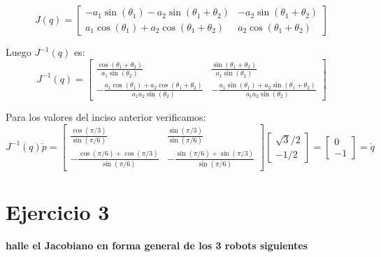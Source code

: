 \documentclass[a4paper,12pt]{article}
\begin{document}
\begin{equation}
    J(q) = 
    \begin{bmatrix}
        -a_1\sin(\theta_1) - a_2\sin(\theta_1 + \theta_2) & -a_2\sin(\theta_1 + \theta_2)\\
        a_1\cos(\theta_1) + a_2\cos(\theta_1 + \theta_2)  & a_2\cos(\theta_1 + \theta_2)
    \end{bmatrix}
\end{equation}

Luego $J^{-1}(q)$ es:
\begin{equation}
    J^{-1}(q) =
    \begin{bmatrix}
        \frac{\cos(\theta_1 + \theta_2)}{a_1 \sin(\theta_2)} & \frac{\sin(\theta_1 + \theta_2)}{a_1 \sin(\theta_2)} \\
        -\frac{a_1 \cos(\theta_1) + a_2 \cos(\theta_1 + \theta_2)}{a_1 a_2 \sin(\theta_2)} & -\frac{a_1 \sin(\theta_1) + a_2 \sin(\theta_1 + \theta_2)}{a_1 a_2 \sin(\theta_2)}
    \end{bmatrix}
\end{equation}

Para los valores del inciso anterior verificamos:
\begin{equation*}
    J^{-1}(q)\dot{p} =
    \begin{bmatrix}
        \frac{\cos(\pi/3)}{\sin(\pi/6)} & \frac{\sin(\pi/3)}{\sin(\pi/6)} \\
        -\frac{\cos(\pi/6) + \cos(\pi/3)}{\sin(\pi/6)} & -\frac{\sin(\pi/6) + \sin(\pi/3)}{\sin(\pi/6)}
    \end{bmatrix}
    \begin{bmatrix}
        \sqrt{3}/2\\
        -1/2
    \end{bmatrix}
    = 
    \begin{bmatrix}
        0\\
        -1
    \end{bmatrix}
    = \dot{q}
\end{equation*}

\section{Ejercicio 3}
\textbf{halle el Jacobiano en forma general de los 3 robots siguientes}
\subsection{}
\end{document}
